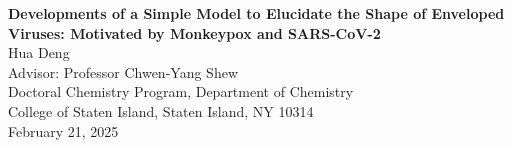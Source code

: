 \documentclass[12pt]{article}
\begin{document}
\doublespacing

\begin{center}
{\Large \textbf{Developments of a Simple Model to Elucidate the Shape of Enveloped Viruses: Motivated by Monkeypox and SARS-CoV-2}}\\[1.5ex]

\singlespace
{\normalsize  Hua Deng}\\

Advisor: Professor Chwen-Yang Shew\\
Doctoral Chemistry Program, Department of Chemistry\\
College of Staten Island, Staten Island, NY 10314\\

{\normalsize February 21, 2025}
\end{center}
\end{document}
